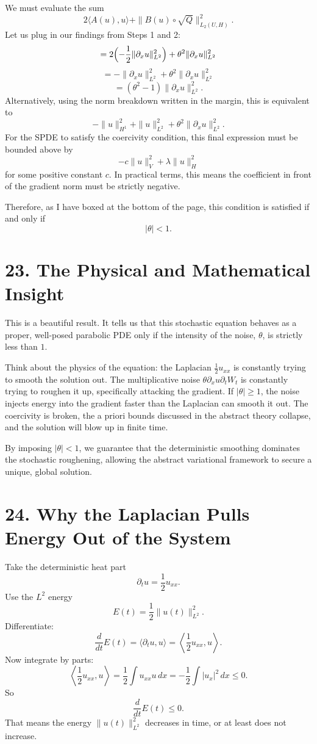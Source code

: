 \documentclass[11pt]{article}
\theoremstyle{definition}
\theoremstyle{remark}
\begin{document}
We must evaluate the sum
\[
2\langle A(u),u\rangle+\|B(u)\circ \sqrt{Q}\|_{L_2(U,H)}^2.
\]
Let us plug in our findings from Steps 1 and 2:
\[
=2\Bigl(-\frac{1}{2}\|\partial_x u\|_{L^2}^2\Bigr)+\theta^2\|\partial_x u\|_{L^2}^2
\]
\[
=-\|\partial_x u\|_{L^2}^2+\theta^2\|\partial_x u\|_{L^2}^2
\]
\[
=(\theta^2-1)\|\partial_x u\|_{L^2}^2.
\]
Alternatively, using the norm breakdown written in the margin, this is equivalent to
\[
-\|u\|_{H^1}^2+\|u\|_{L^2}^2+\theta^2\|\partial_x u\|_{L^2}^2.
\]
For the SPDE to satisfy the coercivity condition, this final expression must be bounded above by
\[
-c\|u\|_V^2+\lambda\|u\|_H^2
\]
for some positive constant $c$. In practical terms, this means the coefficient in front of the gradient norm must be strictly negative.

Therefore, as I have boxed at the bottom of the page, this condition is satisfied if and only if
\[
|\theta|<1.
\]

\section*{23. The Physical and Mathematical Insight}
This is a beautiful result. It tells us that this stochastic equation behaves as a proper, well-posed parabolic PDE only if the intensity of the noise, $\theta$, is strictly less than $1$.

Think about the physics of the equation: the Laplacian $\frac{1}{2}u_{xx}$ is constantly trying to smooth the solution out. The multiplicative noise $\theta\partial_x u\partial_t W_t$ is constantly trying to roughen it up, specifically attacking the gradient. If $|\theta|\ge 1$, the noise injects energy into the gradient faster than the Laplacian can smooth it out. The coercivity is broken, the a priori bounds discussed in the abstract theory collapse, and the solution will blow up in finite time.

By imposing $|\theta|<1$, we guarantee that the deterministic smoothing dominates the stochastic roughening, allowing the abstract variational framework to secure a unique, global solution.


\section*{24. Why the Laplacian Pulls Energy Out of the System}
Take the deterministic heat part
\[
\partial_t u = \frac{1}{2}u_{xx}.
\]
Use the $L^2$ energy
\[
E(t)=\frac{1}{2}\|u(t)\|_{L^2}^2.
\]
Differentiate:
\[
\frac{d}{dt}E(t)=\langle \partial_t u,u\rangle=\left\langle \frac{1}{2}u_{xx},u\right\rangle.
\]
Now integrate by parts:
\[
\left\langle \frac{1}{2}u_{xx},u\right\rangle
=\frac{1}{2}\int u_{xx}u\,dx
=-\frac{1}{2}\int |u_x|^2\,dx
\le 0.
\]
So
\[
\frac{d}{dt}E(t)\le 0.
\]
That means the energy $\|u(t)\|_{L^2}^2$ decreases in time, or at least does not increase.
\end{document}
